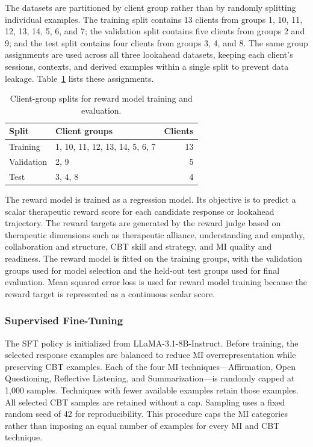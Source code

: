 The datasets are partitioned by client group rather than by randomly splitting individual examples. The training split contains 13 clients from groups 1, 10, 11, 12, 13, 14, 5, 6, and 7; the validation split contains five clients from groups 2 and 9; and the test split contains four clients from groups 3, 4, and 8. The same group assignments are used across all three lookahead datasets, keeping each client's sessions, contexts, and derived examples within a single split to prevent data leakage. Table~\ref{tab:reward-dataset-splits} lists these assignments.

\begin{table}[htbp]
\centering
\caption{Client-group splits for reward model training and evaluation.}
\label{tab:reward-dataset-splits}
\begin{tabular}{llr}
\hline
Split & Client groups & Clients \\
\hline
Training & 1, 10, 11, 12, 13, 14, 5, 6, 7 & 13 \\
Validation & 2, 9 & 5 \\
Test & 3, 4, 8 & 4 \\
\hline
\end{tabular}
\end{table}

The reward model is trained as a regression model. Its objective is to predict a scalar therapeutic reward score for each candidate response or lookahead trajectory. The reward targets are generated by the reward judge based on therapeutic dimensions such as therapeutic alliance, understanding and empathy, collaboration and structure, CBT skill and strategy, and MI quality and readiness. The reward model is fitted on the training groups, with the validation groups used for model selection and the held-out test groups used for final evaluation. Mean squared error loss is used for reward model training because the reward target is represented as a continuous scalar score.

\subsubsection{Supervised Fine-Tuning}
\label{sec:sft-training-configuration}

The SFT policy is initialized from LLaMA-3.1-8B-Instruct. Before training, the selected response examples are balanced to reduce MI overrepresentation while preserving CBT examples. Each of the four MI techniques---Affirmation, Open Questioning, Reflective Listening, and Summarization---is randomly capped at 1,000 samples. Techniques with fewer available examples retain those examples. All selected CBT samples are retained without a cap. Sampling uses a fixed random seed of 42 for reproducibility. This procedure caps the MI categories rather than imposing an equal number of examples for every MI and CBT technique.

